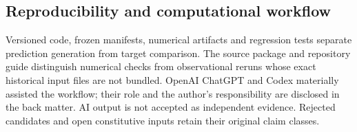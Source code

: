 \subsection{Reproducibility and computational workflow}
\label{sec:reproducibility-workflow}
Versioned code, frozen manifests, numerical artifacts and regression tests
separate prediction generation from target comparison. The source package
and repository guide distinguish numerical checks from observational reruns
whose exact historical input files are not bundled.
OpenAI ChatGPT and Codex materially assisted the workflow; their role and
the author's responsibility are disclosed in the back matter.
AI output is not accepted as independent evidence. Rejected candidates
and open constitutive inputs retain their original claim classes.
